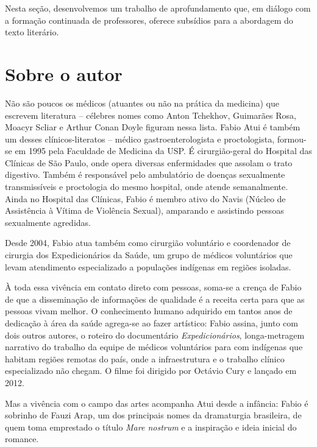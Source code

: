 \documentclass[12pt]{extarticle}
\begin{document}
Nesta seção, desenvolvemos um trabalho de aprofundamento que, em diálogo
com a formação continuada de professores, oferece subsídios para a
abordagem do texto literário.


\section{Sobre o autor}

Não são poucos os médicos (atuantes ou não na prática da medicina) que escrevem literatura – célebres nomes como Anton Tchekhov, Guimarães Rosa, Moacyr Scliar e Arthur Conan Doyle figuram nessa lista. Fabio Atui é também um desses clínicos-literatos – médico gastroenterologista e proctologista, formou-se em 1995 pela Faculdade de Medicina da USP. É cirurgião-geral do Hospital das Clínicas de São Paulo, onde opera diversas enfermidades que assolam o trato digestivo. Também é responsável pelo ambulatório de doenças sexualmente transmissíveis e proctologia do mesmo hospital, onde atende semanalmente. Ainda no Hospital das Clínicas, Fabio é membro ativo do Navis (Núcleo de Assistência à Vítima de Violência Sexual), amparando e assistindo pessoas sexualmente agredidas.

Desde 2004, Fabio atua também como cirurgião voluntário e coordenador de cirurgia dos Expedicionários da Saúde, um grupo de médicos voluntários que levam atendimento especializado a populações indígenas em regiões isoladas. 

À toda essa vivência em contato direto com pessoas, soma-se a crença de Fabio de que a disseminação de informações de qualidade é a receita certa para que as pessoas vivam melhor. O conhecimento humano adquirido em tantos anos de dedicação à área da saúde agrega-se ao fazer artístico: Fabio assina, junto com dois outros autores, o roteiro do documentário \emph{Expedicionários}, longa-metragem narrativo do trabalho da equipe de médicos voluntários para com indígenas que habitam regiões remotas do país, onde a infraestrutura e o trabalho clínico especializado não chegam. O filme foi dirigido por Octávio Cury e lançado em 2012. 

Mas a vivência com o campo das artes acompanha Atui desde a infância: Fabio é sobrinho de Fauzi Arap, um dos principais nomes da dramaturgia brasileira, de quem toma emprestado o título \emph{Mare nostrum} e a inspiração e ideia inicial do romance.




\end{document}
